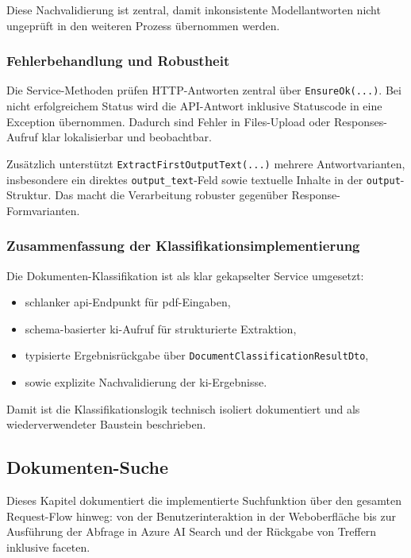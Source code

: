 Diese Nachvalidierung ist zentral, damit inkonsistente Modellantworten nicht ungeprüft in den weiteren Prozess übernommen werden.

\subsubsection{Fehlerbehandlung und Robustheit}

Die Service-Methoden prüfen HTTP-Antworten zentral über \texttt{EnsureOk(...)}. Bei nicht erfolgreichem Status wird die API-Antwort inklusive Statuscode in eine Exception übernommen. Dadurch sind Fehler in Files-Upload oder Responses-Aufruf klar lokalisierbar und beobachtbar.

Zusätzlich unterstützt \texttt{ExtractFirstOutputText(...)} mehrere Antwortvarianten, insbesondere ein direktes \texttt{output\_text}-Feld sowie textuelle Inhalte in der \texttt{output}-Struktur. Das macht die Verarbeitung robuster gegenüber Response-Formvarianten.

\subsubsection{Zusammenfassung der Klassifikationsimplementierung}

Die Dokumenten-Klassifikation ist als klar gekapselter Service umgesetzt:
\begin{itemize}
    \item schlanker \acrshort{api}-Endpunkt für \acrshort{pdf}-Eingaben,
    \item schema-basierter \gls{ki}-Aufruf für strukturierte Extraktion,
    \item typisierte Ergebnisrückgabe über \texttt{DocumentClassificationResultDto},
    \item sowie explizite Nachvalidierung der \gls{ki}-Ergebnisse.
\end{itemize}

Damit ist die Klassifikationslogik technisch isoliert dokumentiert und als wiederverwendeter Baustein beschrieben.

\subsection{Dokumenten-Suche}

Dieses Kapitel dokumentiert die implementierte Suchfunktion über den gesamten Request-Flow hinweg: von der Benutzerinteraktion in der Weboberfläche bis zur Ausführung der Abfrage in Azure AI Search und der Rückgabe von Treffern inklusive \gls{facet}en.

